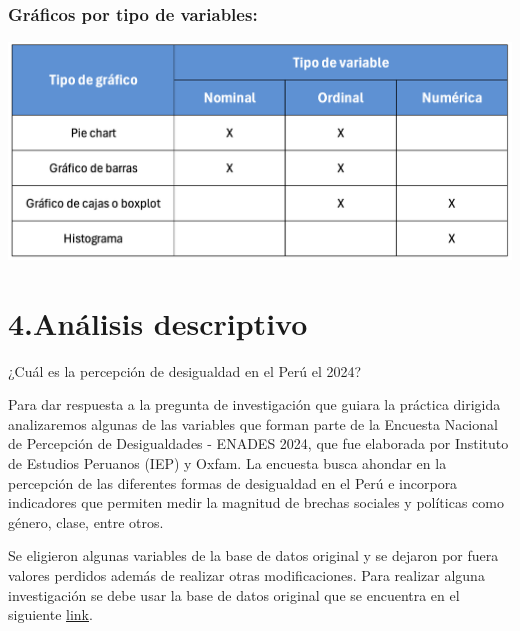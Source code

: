 \documentclass[
]{article}
\begin{document}
\hypertarget{gruxe1ficos-por-tipo-de-variables}{%
\subsubsection{\texorpdfstring{\textbf{Gráficos por tipo de
variables:}}{Gráficos por tipo de variables:}}\label{gruxe1ficos-por-tipo-de-variables}}

\begin{center}\includegraphics[width=0.6\linewidth]{pd2_GrafTipoVar} \end{center}

\hypertarget{anuxe1lisis-descriptivo}{%
\section{\texorpdfstring{\textbf{4.Análisis
descriptivo}}{4.Análisis descriptivo}}\label{anuxe1lisis-descriptivo}}

¿Cuál es la percepción de desigualdad en el Perú el 2024? 🤔

Para dar respuesta a la pregunta de investigación que guiara la práctica
dirigida analizaremos algunas de las variables que forman parte de la
Encuesta Nacional de Percepción de Desigualdades - ENADES 2024, que fue
elaborada por Instituto de Estudios Peruanos (IEP) y Oxfam. La encuesta
busca ahondar en la percepción de las diferentes formas de desigualdad
en el Perú e incorpora indicadores que permiten medir la magnitud de
brechas sociales y políticas como género, clase, entre otros.

Se eligieron algunas variables de la base de datos original y se dejaron
por fuera valores perdidos además de realizar otras modificaciones. Para
realizar alguna investigación se debe usar la base de datos original que
se encuentra en el siguiente
\href{https://peru.oxfam.org/ENADES-2024}{link}.
\end{document}
